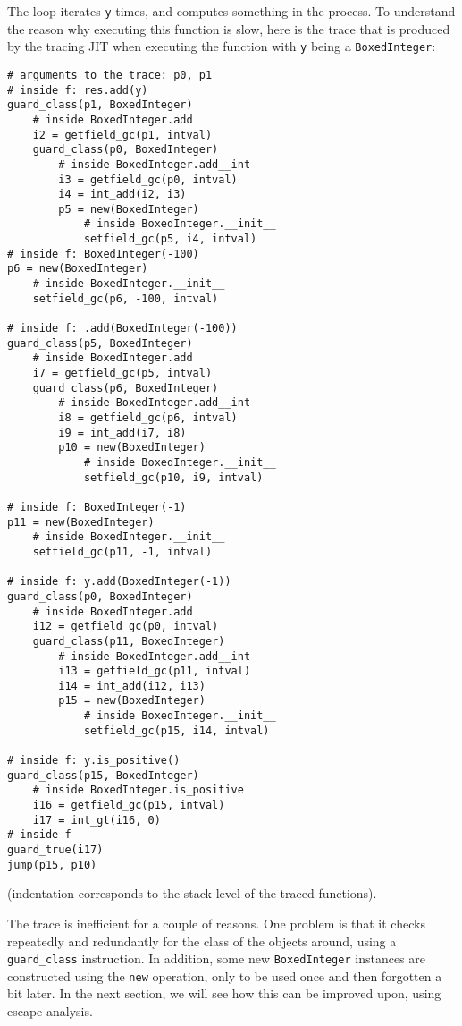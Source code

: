 \documentclass{sigplanconf}
\begin{document}
The loop iterates \texttt{y} times, and computes something in the process. To
understand the reason why executing this function is slow, here is the trace
that is produced by the tracing JIT when executing the function with \texttt{y}
being a \texttt{BoxedInteger}:

\begin{verbatim}
# arguments to the trace: p0, p1
# inside f: res.add(y)
guard_class(p1, BoxedInteger)
    # inside BoxedInteger.add
    i2 = getfield_gc(p1, intval)
    guard_class(p0, BoxedInteger)
        # inside BoxedInteger.add__int
        i3 = getfield_gc(p0, intval)
        i4 = int_add(i2, i3)
        p5 = new(BoxedInteger)
            # inside BoxedInteger.__init__
            setfield_gc(p5, i4, intval)
# inside f: BoxedInteger(-100) 
p6 = new(BoxedInteger)
    # inside BoxedInteger.__init__
    setfield_gc(p6, -100, intval)

# inside f: .add(BoxedInteger(-100))
guard_class(p5, BoxedInteger)
    # inside BoxedInteger.add
    i7 = getfield_gc(p5, intval)
    guard_class(p6, BoxedInteger)
        # inside BoxedInteger.add__int
        i8 = getfield_gc(p6, intval)
        i9 = int_add(i7, i8)
        p10 = new(BoxedInteger)
            # inside BoxedInteger.__init__
            setfield_gc(p10, i9, intval)

# inside f: BoxedInteger(-1)
p11 = new(BoxedInteger)
    # inside BoxedInteger.__init__
    setfield_gc(p11, -1, intval)

# inside f: y.add(BoxedInteger(-1))
guard_class(p0, BoxedInteger)
    # inside BoxedInteger.add
    i12 = getfield_gc(p0, intval)
    guard_class(p11, BoxedInteger)
        # inside BoxedInteger.add__int
        i13 = getfield_gc(p11, intval)
        i14 = int_add(i12, i13)
        p15 = new(BoxedInteger)
            # inside BoxedInteger.__init__
            setfield_gc(p15, i14, intval)

# inside f: y.is_positive()
guard_class(p15, BoxedInteger)
    # inside BoxedInteger.is_positive
    i16 = getfield_gc(p15, intval)
    i17 = int_gt(i16, 0)
# inside f
guard_true(i17)
jump(p15, p10)
\end{verbatim}

(indentation corresponds to the stack level of the traced functions).

The trace is inefficient for a couple of reasons. One problem is that it checks
repeatedly and redundantly for the class of the objects around, using a
\texttt{guard\_class} instruction. In addition, some new \texttt{BoxedInteger} instances are
constructed using the \texttt{new} operation, only to be used once and then forgotten
a bit later. In the next section, we will see how this can be improved upon,
using escape analysis.
\end{document}
